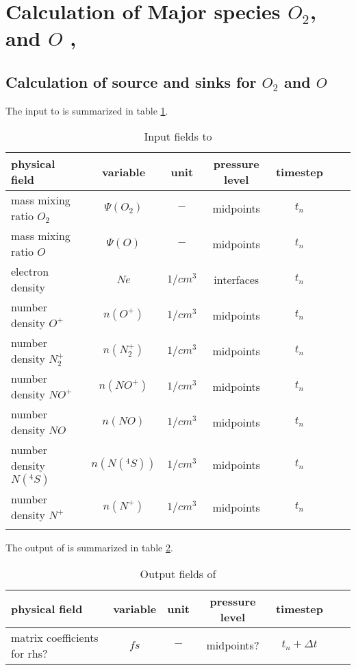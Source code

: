 %
\section{Calculation of Major species $O_2$, and $O$  , }\label{cap:comp_o2o}
%
\subsection{Calculation of source and sinks for $O_2$ and $O$}\label{subcap:comp_o2o}
%
The input to  is summarized in table
\ref{tab:input_comp_o2o}.
%
\begin{table}[tb]
\begin{tabular}{|p{3.5cm} ||c|c|c|c|c|c|} \hline
physical field               & variable        & unit&pressure
level& timestep
\\ \hline \hline
%
mass mixing ratio $O_2$ &       $\Psi(O_2)$              & $-$   &  midpoints & $t_n$\\
mass mixing ratio $O$ &         $\Psi(O  )$              & $-$   &  midpoints & $t_n$\\
electron density&       $Ne$              & $1/cm^3$   &  interfaces & $t_n$\\
number density $O^+$&       $n(O^+)$              & $1/cm^3$   &  midpoints & $t_n$\\
number density $N_2^+$&       $n(N_2^+)$              & $1/cm^3$   &  midpoints & $t_n$\\
number density $NO^+$&       $n(NO^+)$              & $1/cm^3$   &  midpoints & $t_n$\\
number density $NO$&       $n(NO)$              & $1/cm^3$   &  midpoints & $t_n$\\
number density $N(^4S)$&       $n(N(^4S))$              & $1/cm^3$   &  midpoints & $t_n$\\
number density $N^+$&       $n(N^+)$              & $1/cm^3$   &  midpoints & $t_n$\\

 \\ \hline
\end{tabular}
\caption{Input fields to }
\label{tab:input_comp_o2o}
\end{table}
%
The output of  is summarized in table
\ref{tab:output_comp_o2o}.
%
\begin{table}[tb]
\begin{tabular}{|p{3.5cm} ||c|c|c|c|c|c|} \hline
physical field               & variable        & unit&pressure
level& timestep \\ \hline \hline matrix coefficients for rhs? & $fs$
& $-$ & midpoints? & $t_n+\Delta t$
\\ \hline \hline
\end{tabular}
\caption{Output fields of }
\label{tab:output_comp_o2o}
\end{table}
